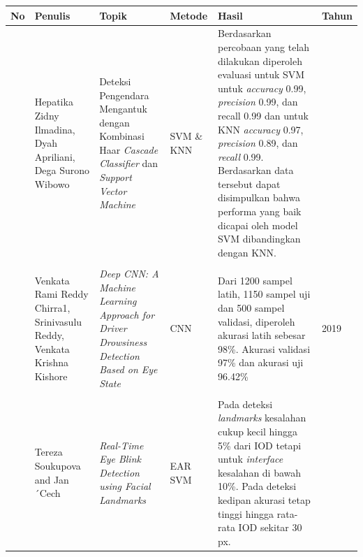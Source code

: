          \begin{table}[H]
        \centering
         \label{Tabel Perbandingan Referensi}
        \begin{tabular}%
        {>{\raggedright\arraybackslash}p{0.3cm} 
        >{\raggedright\arraybackslash}p{2.0cm} 
        >{\raggedright\arraybackslash}p{2.5cm} 
        >{\raggedright\arraybackslash}p{1.5cm} 
        >{\raggedright\arraybackslash}p{4.0cm} 
        >{\raggedright\arraybackslash}p{0.9cm}}
    
            \hline
            \textbf{No} & \textbf{Penulis} & \textbf{Topik} &\textbf{ Metode} & \textbf{Hasil} & \textbf{Tahun} \\    
            \hline

            3 
            & 
            Hepatika Zidny Ilmadina, Dyah Apriliani, Dega Surono Wibowo
            &
            Deteksi Pengendara Mengantuk dengan Kombinasi Haar 
                \textit{Cascade Classifier} dan \textit{Support Vector Machine}
            &
            SVM \& KNN
            &
            Berdasarkan percobaan yang telah dilakukan diperoleh evaluasi untuk SVM untuk \textit{accuracy} 0.99, \textit{precision} 0.99, dan recall 0.99 dan untuk KNN \textit{accuracy} 0.97, \textit{precision} 0.89, dan \textit{recall} 0.99. Berdasarkan data tersebut dapat disimpulkan bahwa performa yang baik dicapai oleh model SVM dibandingkan dengan KNN.
            &
            2020 \\
            \\
        
                4
            &
            Venkata Rami Reddy Chirra1, Srinivasulu Reddy, Venkata Krishna Kishore
            &
            \textit{Deep CNN: A Machine Learning Approach for Driver Drowsiness Detection Based on Eye State}
            &
            CNN
            &
            Dari 1200 sampel latih, 1150 sampel uji dan 500 sampel validasi, diperoleh  akurasi latih sebesar 98\%. Akurasi validasi 97\% dan akurasi uji 96.42\%

            &

            2019 \\
            \\

             5
            & 
            Tereza Soukupova and Jan ´Cech &
           \textit{ Real-Time Eye Blink Detection using Facial Landmarks} &
            EAR SVM &

           Pada deteksi \textit{landmarks} kesalahan cukup kecil hingga 5\% dari IOD tetapi untuk \textit{interface} kesalahan di bawah 10\%. Pada deteksi kedipan akurasi tetap tinggi hingga rata-rata IOD sekitar 30 px.
             &
            2017\\

             \hline

        \end{tabular}
    \end{table}



